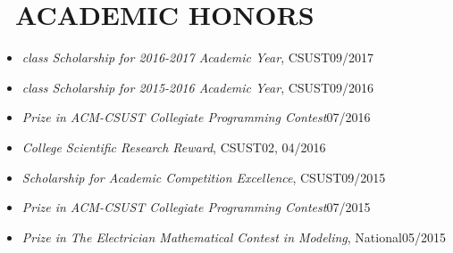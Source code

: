 \documentclass{resume}
\begin{document}
\section{\faStar\ ACADEMIC HONORS}
\begin{itemize}
 \item[]{\textit{ class Scholarship for 2016-2017 Academic Year}, CSUST}{\hfill{09/2017}}

 \item[]{\textit{ class Scholarship for 2015-2016 Academic Year}, CSUST}{\hfill{09/2016}}
 \item[]{\textit{ Prize in ACM-CSUST Collegiate Programming Contest}}{\hfill{07/2016}}
 \item[]{\textit{College Scientific Research Reward}, CSUST}{\hfill{02, 04/2016}}
 \item[]{\textit{Scholarship for Academic Competition Excellence},
   CSUST}{\hfill{09/2015}}
\item[]{\textit{ Prize in ACM-CSUST Collegiate Programming Contest}}{\hfill{07/2015}}
 \item[]{\textit{ Prize in The Electrician Mathematical Contest in
       Modeling}, National}{\hfill{05/2015}}
\end{itemize}
%
%
\end{document}
